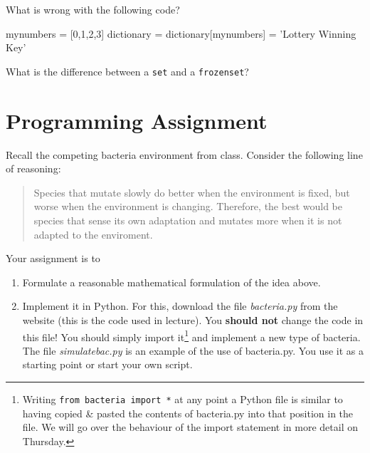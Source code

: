 \question
What is wrong with the following code?

\begin{python}
mynumbers = [0,1,2,3]
dictionary = {}
dictionary[mynumbers] = 'Lottery Winning Key'
\end{python}

\question
What is the difference between a \lstinline{set} and a \lstinline{frozenset}?

\chapter{Programming Assignment}

Recall the competing bacteria environment from class. Consider the following line of reasoning:

\begin{quote}
Species that mutate slowly do better when the environment is fixed, but worse when the environment is changing. Therefore, the best would be species that sense its own adaptation and mutates more when it is not adapted to the enviroment.
\end{quote}

Your assignment is to 

\begin{enumerate}
\item Formulate a reasonable mathematical formulation of the idea above.
\item Implement it in Python. For this, download the file \textit{bacteria.py} from the website (this is the code used in lecture). You \textbf{should not} change the code in this file! You should simply import it\footnote{Writing \lstinline{from bacteria import *} at any point a Python file is similar to having copied \& pasted the contents of bacteria.py into that position in the file. We will go over the behaviour of the import statement in more detail on Thursday.} and implement a new type of bacteria. The file \textit{simulatebac.py} is an example of the use of bacteria.py. You use it as a starting point or start your own script.
\end{enumerate} 


